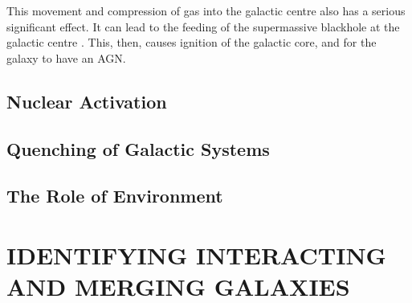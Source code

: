 This movement and compression of gas into the galactic centre also has a serious significant effect. It can lead to the feeding of the supermassive blackhole at the galactic centre \citep{Movement of gas to galactic centre causing AGN}. This, then, causes ignition of the galactic core, and for the galaxy to have an AGN.

\subsection{Nuclear Activation}
\subsection{Quenching of Galactic Systems}
\subsection{The Role of Environment}

\section{IDENTIFYING INTERACTING AND MERGING GALAXIES}